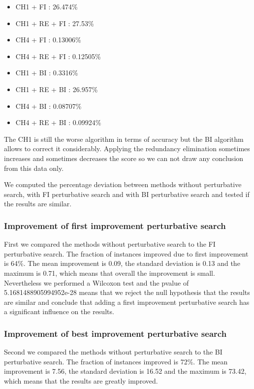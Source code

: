 \documentclass[a4paper,12pt]{article}
\begin{document}
\begin{itemize}
    \item CH1 + FI : 26.474\%
    \item CH1 + RE + FI : 27.53\%
    \item CH4 + FI : 0.13006\%
    \item CH4 + RE + FI : 0.12505\%
    \item CH1 + BI : 0.3316\%
    \item CH1 + RE + BI : 26.957\%
    \item CH4 + BI : 0.08707\%
    \item CH4 + RE + BI : 0.09924\%
\end{itemize}

The CH1 is still the worse algorithm in terms of accuracy but the BI algorithm allows to correct it considerably. Applying the redundancy elimination sometimes increases and sometimes decreases the score so we can not draw any conclusion from this data only.

We computed the percentage deviation between methods without perturbative search, with FI perturbative search and with BI perturbative search and tested if the results are similar.

\subsubsection{Improvement of first improvement perturbative search}

First we compared the methods without perturbative search to the FI perturbative search. The fraction of instances improved due to first improvement is 64\%. The mean improvement is 0.09, the standard deviation is 0.13 and the maximum is 0.71, which means that overall the improvement is small.
Nevertheless we performed a Wilcoxon test and the pvalue of 5.1681488905994952e-28 means that we reject the null hypothesis that the results are similar and conclude that adding a first improvement perturbative search has a significant influence on the results.

\subsubsection{Improvement of best improvement perturbative search}

Second we compared the methods without perturbative search to the BI perturbative search. The fraction of instances improved is 72\%. The mean improvement is 7.56, the standard deviation is 16.52 and the maximum is 73.42, which means that the results are greatly improved.
\end{document}
